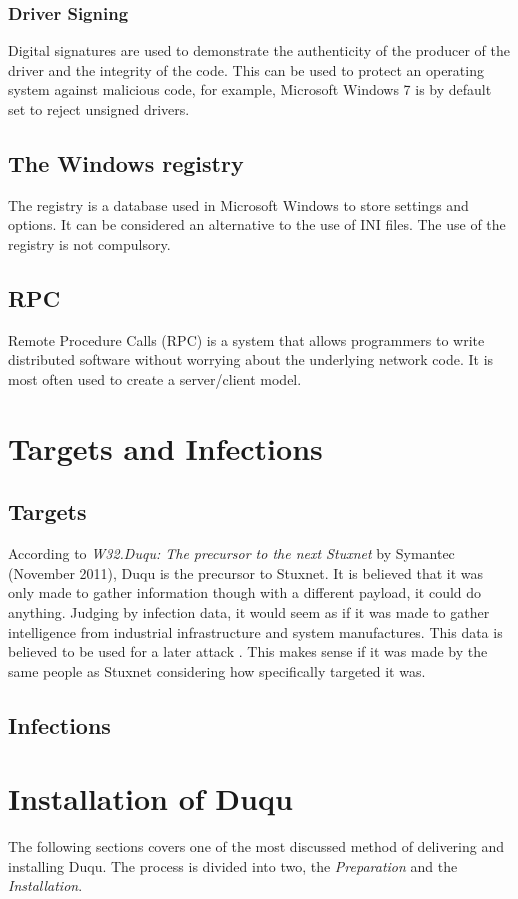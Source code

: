 \documentclass[11pt,english,a4paper]{report}
\begin{document}
\subsection{Driver Signing} \label{DRIVER_SIGN}
Digital signatures are used to demonstrate the authenticity of the producer of the driver and the integrity of the code. This can be used to protect an operating system against malicious code, for example, Microsoft Windows 7 is by default set to reject unsigned drivers.  

\section{The Windows registry}
The registry is a database used in Microsoft Windows to store settings and options. It can be considered an alternative to the use of INI files. The use of the registry is not compulsory.

\section{RPC}
Remote Procedure Calls (RPC) is a system that allows programmers to write distributed software without worrying about the underlying network code. It is most often used to create a server/client model. \cite{MSRPC}

\chapter{Targets and Infections}
\section{Targets}
According to \textit{W32.Duqu: The precursor to the next Stuxnet}\cite{DUQU_SYMANTEC} by Symantec (November 2011), Duqu is the precursor to Stuxnet. It is believed that it was only made to gather information though with a different payload, it could do anything. Judging by infection data, it would seem as if it was made to gather intelligence from industrial infrastructure and system manufactures. This data is believed to be used for a later attack \cite{DUQU_SYMANTEC}. This makes sense if it was made by the same people as Stuxnet considering how specifically targeted it was. 

\section{Infections}


\chapter{Installation of Duqu}
The following sections covers one of the most discussed method of delivering and installing Duqu. The process is divided into two, the \textit{Preparation} and the \textit{Installation}.
\end{document}
